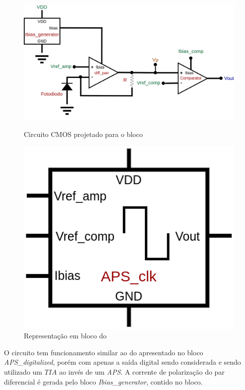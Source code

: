\begin{figure}[!h]
 \centering
    \centering
    \caption{Circuito CMOS projetado para o bloco \NomeBloco} 
    \includegraphics[scale=0.3]{Circuitos/APS_clk.png}
    \label{\NomePFig}
\end{figure}

\begin{figure}[!h]
 \centering
    \centering
    \caption{\label{\NomeSFig}Representação em bloco do \NomeBloco}
    \includegraphics[scale=0.3]{Circuitos/APS_clk_block.png}
\end{figure}

O circuito tem funcionamento similar ao do apresentado no bloco \textit{APS\_digitalized}, por\'em com apenas a sa\'ida digital sendo considerada e sendo utilizado um $TIA$ ao inv\'es de um \textit{APS}. A corrente de polarização do par diferencial \'e gerada pelo bloco \textit{Ibias\_generator}, contido no bloco.

